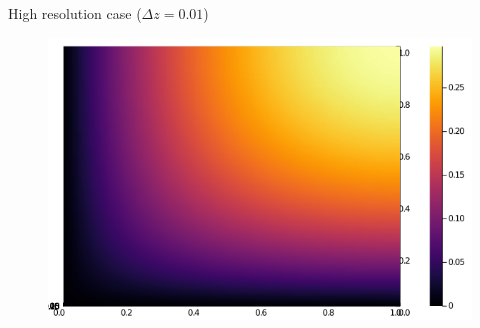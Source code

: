 \documentclass[11pt]{article}
\begin{document}
	\begin{center}
		High resolution case ($ \Delta z = 0.01 $)
		\begin{figure}[hbt!]
		\centering
		    \includegraphics[scale=0.4]{2D_high_res.png}
		 \end{figure}
	\end{center}

	\newpage
\end{document}
